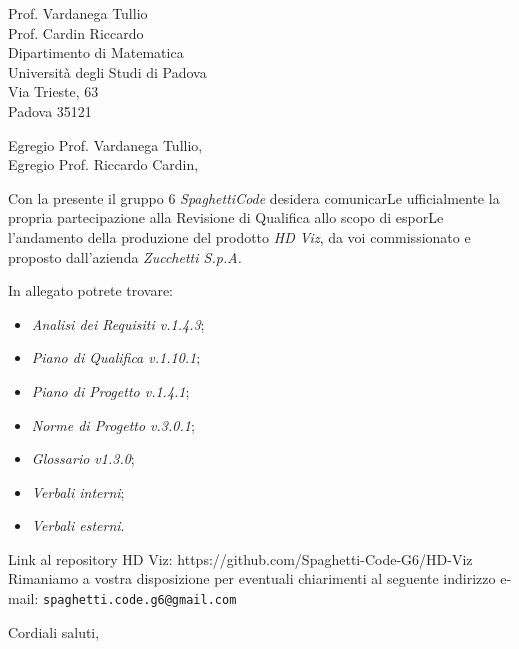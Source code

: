 \documentclass[a4paper,12pt]{letteracdp}
\date{16 giugno 2021}
\begin{document}
\begin{letter}{
\vspace*{-2\baselineskip}
Prof. Vardanega Tullio \\
Prof. Cardin Riccardo \\
Dipartimento di Matematica \\
Università degli Studi di Padova \\
Via Trieste, 63 \\
Padova 35121}

\opening{Egregio Prof. Vardanega Tullio, \\
\noindent Egregio Prof. Riccardo Cardin,}

\begin{flushleft}
Con la presente il gruppo 6 \textit{SpaghettiCode} desidera comunicarLe ufficialmente la propria partecipazione alla Revisione di 
Qualifica allo scopo di esporLe l'andamento della produzione del prodotto \textit{HD Viz}, da voi commissionato e proposto 
dall'azienda \textit{Zucchetti S.p.A.}

In allegato potrete trovare:
\end{flushleft}

\begin{itemize}
\item \emph{Analisi dei Requisiti v.1.4.3};
\item \emph{Piano di Qualifica v.1.10.1};
\item \emph{Piano di Progetto v.1.4.1};
\item \emph{Norme di Progetto v.3.0.1};
\item \emph{Glossario v1.3.0};
\item \emph{Verbali interni};
\item \emph{Verbali esterni}.
\end{itemize}

\begin{flushleft}
Link al repository HD Viz: https://github.com/Spaghetti-Code-G6/HD-Viz \\

Rimaniamo a vostra disposizione per eventuali chiarimenti al seguente indirizzo e-mail: {\texttt{spaghetti.code.g6@gmail.com}}
\end{flushleft}

\closing{Cordiali saluti,}

\end{letter}
\end{document}
